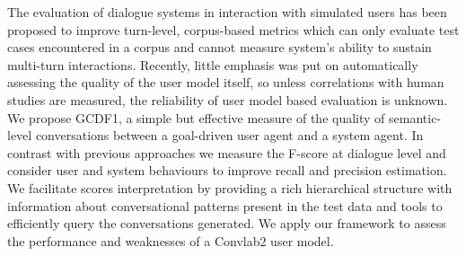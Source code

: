 The evaluation of dialogue systems in interaction with simulated users has been proposed to improve turn-level, corpus-based metrics which can only evaluate test cases encountered in a corpus and cannot measure system's ability to sustain multi-turn interactions. Recently, little emphasis was put on automatically assessing the quality of the user model itself, so unless correlations with human studies are measured, the reliability of user model based evaluation is unknown. We propose GCDF1, a simple but effective measure of the quality of  semantic-level conversations between a goal-driven user agent and a system agent. In contrast with previous approaches we measure the F-score at dialogue level and consider user and system behaviours to improve recall and precision estimation. We facilitate scores interpretation by providing a rich hierarchical structure with information about conversational patterns present in the test data and tools to efficiently query the conversations generated. We apply our framework to assess the performance and weaknesses of a Convlab2 user model.

